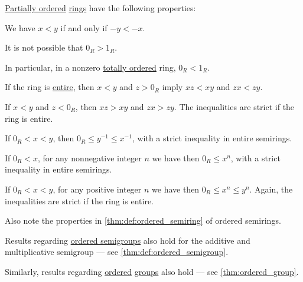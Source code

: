\begin{proposition}\label{thm:ordered_ring}
  \hyperref[def:ordered_semiring]{Partially ordered} \hyperref[def:ring]{rings} have the following properties:
  \begin{thmenum}
     We have \( x < y \) if and only if \( -y < -x \).

     It is not possible that \( 0_R > 1_R \).

    In particular, in a nonzero \hyperref[def:totally_ordered_set]{totally ordered} ring, \( 0_R < 1_R \).

     If the ring is \hyperref[def:entire_semiring]{entire}, then \( x < y \) and \( z > 0_R \) imply \( xz < xy \) and \( zx < zy \).

     If \( x < y \) and \( z < 0_R \), then \( xz > xy \) and \( zx > zy \). The inequalities are strict if the ring is entire.

     If \( 0_R < x < y \), then \( 0_R \leq y^{-1} \leq x^{-1} \), with a strict inequality in entire semirings.

     If \( 0_R < x \), for any nonnegative integer \( n \) we have then \( 0_R \leq x^n \), with a strict inequality in entire semirings.

     If \( 0_R < x < y \), for any positive integer \( n \) we have then \( 0_R \leq x^n \leq y^n \). Again, the inequalities are strict if the ring is entire.
  \end{thmenum}
\end{proposition}
\begin{comments}
  \item Also note the properties in \cref{thm:def:ordered_semiring} of ordered semirings.

  \item Results regarding \hyperref[def:ordered_semigroup]{ordered semigroups} also hold for the additive and multiplicative semigroup --- see \cref{thm:def:ordered_semigroup}.

  \item Similarly, results regarding \hyperref[def:ordered_semigroup]{ordered} \hyperref[def:group]{groups} also hold --- see \cref{thm:ordered_group}.
\end{comments}
